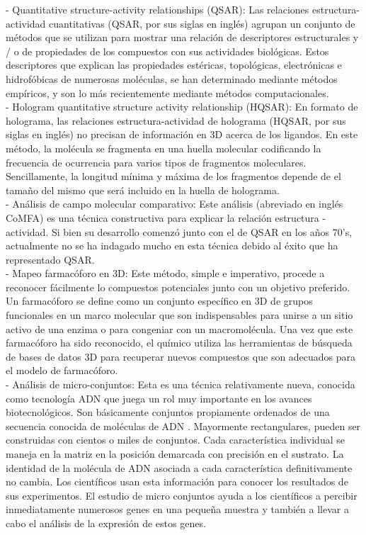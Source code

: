 - Quantitative structure-activity relationships (QSAR): Las relaciones estructura-actividad cuantitativas (QSAR, por sus siglas en inglés) agrupan un conjunto de métodos que se utilizan para mostrar una relación de descriptores estructurales y / o de propiedades de los compuestos con sus actividades biológicas. Estos descriptores que explican las propiedades estéricas, topológicas, electrónicas e hidrofóbicas de numerosas moléculas, se han determinado mediante métodos empíricos, y son lo más recientemente mediante métodos computacionales.\\

- Hologram quantitative structure activity relationship (HQSAR): En formato de holograma, las relaciones estructura-actividad de holograma (HQSAR, por sus siglas en inglés) no precisan de información en 3D acerca de los ligandos. En este método, la molécula se fragmenta en una huella molecular codificando la frecuencia de ocurrencia para varios tipos de fragmentos moleculares. Sencillamente, la longitud mínima y máxima de los fragmentos depende de el tamaño del mismo que será incluido en la huella de holograma.\\

- Análisis de campo molecular comparativo: Este análisis (abreviado en inglés CoMFA) es una técnica constructiva para explicar la relación estructura - actividad. Si bien su desarrollo comenzó junto con el de QSAR en los años 70’s, actualmente no se ha indagado mucho en esta técnica debido al éxito que ha representado QSAR.\\

- Mapeo farmacóforo en 3D: Este método, simple e imperativo, procede a reconocer fácilmente lo compuestos potenciales junto con un objetivo preferido. Un farmacóforo se define como un conjunto específico en 3D de grupos funcionales en un marco molecular que son indispensables para unirse a un sitio activo de una enzima o para congeniar con un macromolécula. Una vez que este farmacóforo ha sido reconocido, el químico utiliza las herramientas de búsqueda de bases de datos 3D para recuperar nuevos compuestos que son adecuados para el modelo de farmacóforo.\\

- Análisis de micro-conjuntos: Esta es una técnica relativamente nueva, conocida como tecnología ADN que juega un rol muy importante en los avances biotecnológicos. Son básicamente conjuntos propiamente ordenados de una secuencia conocida de moléculas de ADN . Mayormente rectangulares, pueden ser construidas con cientos o miles de conjuntos. Cada característica individual se maneja en la matriz en la posición demarcada con precisión en el sustrato. La identidad de la molécula de ADN asociada a cada característica definitivamente no cambia. Los científicos usan esta información para conocer los resultados de sus experimentos. El estudio de micro conjuntos ayuda a los científicos a percibir inmediatamente numerosos genes en una pequeña muestra y también a llevar a cabo el análisis de la expresión de estos genes.\\

